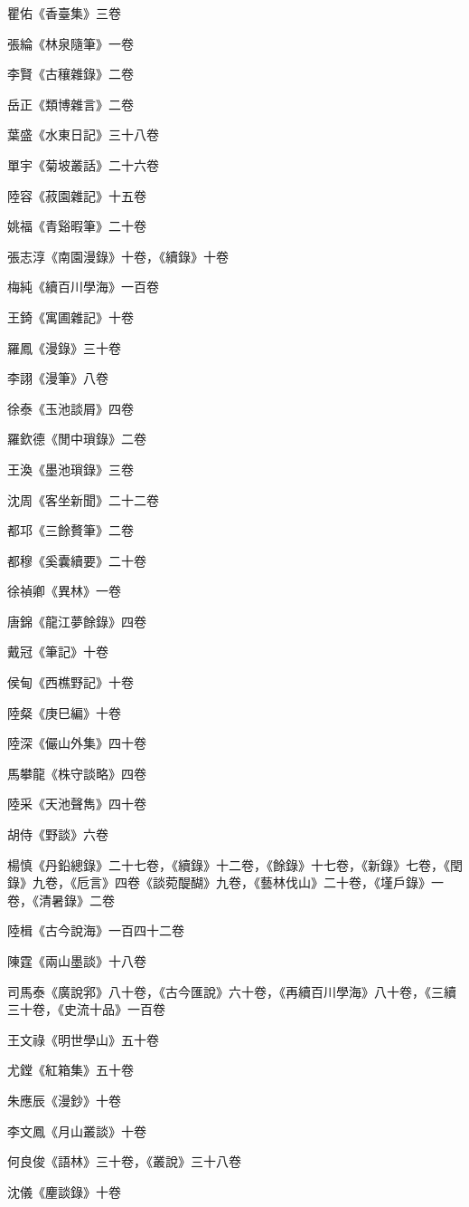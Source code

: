 瞿佑《香臺集》三卷

張綸《林泉隨筆》一卷

李賢《古穰雜錄》二卷

岳正《類博雜言》二卷

葉盛《水東日記》三十八卷

單宇《菊坡叢話》二十六卷

陸容《菽園雜記》十五卷

姚福《青谿暇筆》二十卷

張志淳《南園漫錄》十卷，《續錄》十卷

梅純《續百川學海》一百卷

王錡《寓圃雜記》十卷

羅鳳《漫錄》三十卷

李詡《漫筆》八卷

徐泰《玉池談屑》四卷

羅欽德《閒中瑣錄》二卷

王渙《墨池瑣錄》三卷

沈周《客坐新聞》二十二卷

都邛《三餘贅筆》二卷

都穆《奚囊續要》二十卷

徐禎卿《異林》一卷

唐錦《龍江夢餘錄》四卷

戴冠《筆記》十卷

侯甸《西樵野記》十卷

陸粲《庚巳編》十卷

陸深《儼山外集》四十卷

馬攀龍《株守談略》四卷

陸采《天池聲雋》四十卷

胡侍《野談》六卷

楊慎《丹鉛總錄》二十七卷，《續錄》十二卷，《餘錄》十七卷，《新錄》七卷，《閏錄》九卷，《卮言》四卷《談菀醍醐》九卷，《藝林伐山》二十卷，《墐戶錄》一卷，《清暑錄》二卷

陸楫《古今說海》一百四十二卷

陳霆《兩山墨談》十八卷

司馬泰《廣說郛》八十卷，《古今匯說》六十卷，《再續百川學海》八十卷，《三續三十卷，《史流十品》一百卷

王文祿《明世學山》五十卷

尤鏜《紅箱集》五十卷

朱應辰《漫鈔》十卷

李文鳳《月山叢談》十卷

何良俊《語林》三十卷，《叢說》三十八卷

沈儀《麈談錄》十卷

